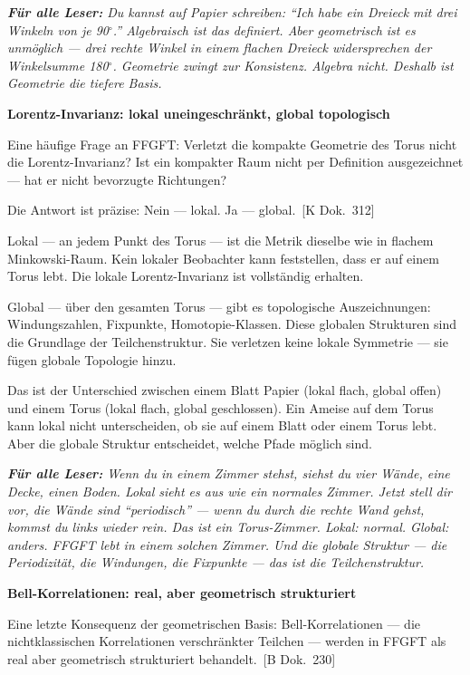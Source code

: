 \documentclass[11pt,oneside]{book}
\newcommand{\status}[1]{\penalty10000\,{\scriptsize\textcolor{gray!60}{[#1]}}}
\newenvironment{laierspur}{%
  \par\vspace{4pt}%
  \noindent\small\itshape\color{blue!60!black}%
  \textbf{Für alle Leser:}\enspace\ignorespaces}{%
  \par\vspace{4pt}\normalsize\normalfont\normalcolor}
\begin{document}
\begin{laierspur}
Du kannst auf Papier schreiben: \enquote{Ich habe ein Dreieck
mit drei Winkeln von je 90$^\circ$.} Algebraisch ist das definiert. Aber
geometrisch ist es unmöglich — drei rechte Winkel in einem flachen
Dreieck widersprechen der Winkelsumme 180$^\circ$. Geometrie zwingt zur
Konsistenz. Algebra nicht. Deshalb ist Geometrie die tiefere Basis.
\end{laierspur}

\textbf{Lorentz-Invarianz: lokal uneingeschränkt, global topologisch}


Eine häufige Frage an FFGFT: Verletzt die kompakte Geometrie des Torus
nicht die Lorentz-Invarianz? Ist ein kompakter Raum nicht per Definition
ausgezeichnet — hat er nicht bevorzugte Richtungen?


Die Antwort ist präzise: Nein — lokal. Ja — global. \status{K Dok.~312}


Lokal — an jedem Punkt des Torus — ist die Metrik dieselbe wie in
flachem Minkowski-Raum. Kein lokaler Beobachter kann feststellen,
dass er auf einem Torus lebt. Die lokale Lorentz-Invarianz ist
vollständig erhalten.


Global — über den gesamten Torus — gibt es topologische Auszeichnungen:
Windungszahlen, Fixpunkte, Homotopie-Klassen. Diese globalen Strukturen
sind die Grundlage der Teilchenstruktur. Sie verletzen keine lokale
Symmetrie — sie fügen globale Topologie hinzu.


Das ist der Unterschied zwischen einem Blatt Papier (lokal flach,
global offen) und einem Torus (lokal flach, global geschlossen).
Ein Ameise auf dem Torus kann lokal nicht unterscheiden, ob sie auf
einem Blatt oder einem Torus lebt. Aber die globale Struktur
entscheidet, welche Pfade möglich sind.


\begin{laierspur}
Wenn du in einem Zimmer stehst, siehst du vier Wände,
eine Decke, einen Boden. Lokal sieht es aus wie ein normales
Zimmer. Jetzt stell dir vor, die Wände sind \enquote{periodisch} — wenn
du durch die rechte Wand gehst, kommst du links wieder rein.
Das ist ein Torus-Zimmer. Lokal: normal. Global: anders.
FFGFT lebt in einem solchen Zimmer. Und die globale Struktur —
die Periodizität, die Windungen, die Fixpunkte — das ist die
Teilchenstruktur.
\end{laierspur}

\textbf{Bell-Korrelationen: real, aber geometrisch strukturiert}


Eine letzte Konsequenz der geometrischen Basis: Bell-Korrelationen —
die nichtklassischen Korrelationen verschränkter Teilchen — werden
in FFGFT als real aber geometrisch strukturiert behandelt. \status{B Dok.~230}
\end{document}

